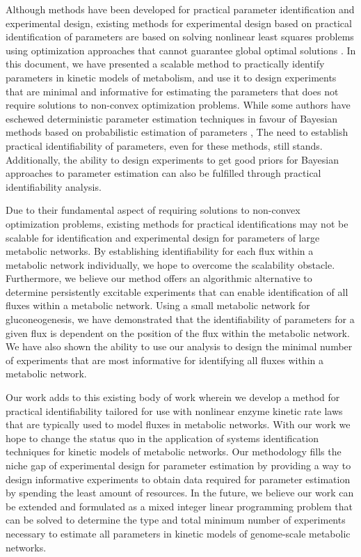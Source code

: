 \documentclass[10pt]{article}
\begin{document}
	Although methods have been developed for practical parameter identification and experimental design, existing methods for experimental design based on practical identification of parameters are based on solving nonlinear least squares problems using optimization approaches that cannot guarantee global optimal solutions \parencite{Raue2009a}. In this document, we have presented a scalable method to practically identify parameters in kinetic models of metabolism, and use it to design experiments that are minimal and informative for estimating the parameters that does not require solutions to non-convex optimization problems. While some authors have eschewed deterministic parameter estimation techniques in favour of Bayesian methods based on probabilistic estimation of parameters \parencite{Saa2016, Saa2016a}, The need to establish practical identifiability of parameters, even for these methods, still stands. Additionally, the ability to design experiments to get good priors for Bayesian approaches to parameter estimation can also be fulfilled through practical identifiability analysis.
	
	Due to their fundamental aspect of requiring solutions to non-convex optimization problems, existing methods for practical identifications may not be scalable for identification and experimental design for parameters of large metabolic networks. By establishing identifiability for each flux within a metabolic network individually, we hope to overcome the scalability obstacle. Furthermore, we believe our method offers an algorithmic alternative to determine persistently excitable experiments that can enable identification of all fluxes within a metabolic network. Using a small metabolic network for gluconeogenesis, we have demonstrated that the identifiability of parameters for a given flux is dependent on the position of the flux within the metabolic network. We have also shown the ability to use our analysis to design the minimal number of experiments that are most informative for identifying all fluxes within a metabolic network.
	
	Our work adds to this existing body of work wherein we develop a method for practical identifiability tailored for use with nonlinear enzyme kinetic rate laws that are typically used to model fluxes in metabolic networks. With our work we hope to change the status quo in the application of systems identification techniques for kinetic models of metabolic networks. Our methodology fills the niche gap of experimental design for parameter estimation by providing a way to design informative experiments to obtain data required for parameter estimation by spending the least amount of resources.	
	In the future, we believe our work can be extended and formulated as a mixed integer linear programming problem that can be solved to determine the type and total minimum number of experiments necessary to estimate all parameters in kinetic models of genome-scale metabolic networks.
	
\end{document}
